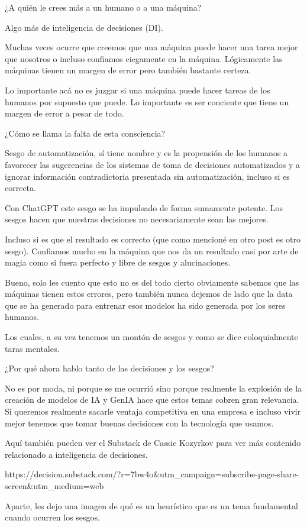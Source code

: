¿A quién le crees más a un humano o a una máquina?


Algo más de inteligencia de decisiones (DI).


Muchas veces ocurre que creemos que una máquina puede hacer una tarea mejor que nosotros o incluso confiamos ciegamente en la máquina. Lógicamente las máquinas tienen un margen de error pero también bastante certeza. 


Lo importante acá no es juzgar si una máquina puede hacer tareas de los humanos por supuesto que puede. Lo importante es ser conciente que tiene un margen de error a pesar de todo.


¿Cómo se llama la falta de esta consciencia? 


Sesgo de automatización, sí tiene nombre y es la propensión de los humanos a favorecer las sugerencias de los sistemas de toma de decisiones automatizados y a ignorar información contradictoria presentada sin automatización, incluso si es correcta.


Con ChatGPT este sesgo se ha impulsado de forma sumamente potente. Los sesgos hacen que nuestras decisiones no necesariamente sean las mejores. 


Incluso si es que el resultado es correcto (que como mencioné en otro post es otro sesgo). Confiamos mucho en la máquina que nos da un resultado casi por arte de magia como si fuera perfecto y libre de sesgos y alucinaciones. 


Bueno, solo les cuento que esto no es del todo cierto obviamente sabemos que las máquinas tienen estos errores, pero también nunca dejemos de lado que la data que se ha generado para entrenar esos modelos ha sido generada por los seres humanos. 


Los cuales, a su vez tenemos un montón de sesgos y como se dice coloquialmente taras mentales. 


¿Por qué ahora hablo tanto de las decisiones y los sesgos?


No es por moda, ni porque se me ocurrió sino porque realmente la explosión de la creación de modelos de IA y GenIA hace que estos temas cobren gran relevancia. Si queremos realmente sacarle ventaja competitiva en una empresa e incluso vivir mejor tenemos que tomar buenas decisiones con la tecnología que usamos. 


Aquí también pueden ver el Substack de Cassie Kozyrkov para ver más contenido relacionado a inteligencia de decisiones. 


https://decision.substack.com/?r=7bw4o&utm_campaign=subscribe-page-share-screen&utm_medium=web


Aparte, les dejo una imagen de qué es un heurístico que es un tema fundamental cuando ocurren los sesgos.







